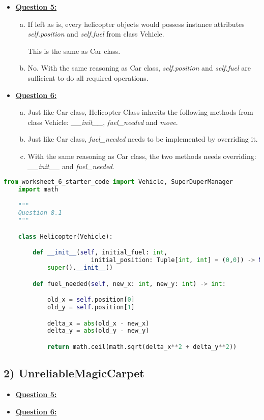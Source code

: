 \documentclass[12pt]{article}
\begin{document}
\begin{itemize}
    \item \underline{\textbf{Question 5:}}
    \begin{enumerate}[a.]
        \item If left as is, every helicopter objects would possess instance attributes
        \textit{self.position} and \textit{self.fuel} from class Vehicle.

        \bigskip

        This is the same as Car class.

        \item No. With the same reasoning as Car class, \textit{self.position}
        and \textit{self.fuel} are sufficient to do all required operations.

    \end{enumerate}
    \item \underline{\textbf{Question 6:}}
    \begin{enumerate}[a.]
        \item Just like Car class, Helicopter Class inherits the following methods
        from class Vehicle: \textit{\_\_init\_\_}, \textit{fuel\_needed} and \textit{move}.

        \item Just like Car class, \textit{fuel\_needed} needs to be
        implemented by overriding it.

        \item With the same reasoning as Car class, the two methods needs
        overriding: \textit{\_\_init\_\_} and \textit{fuel\_needed}.

    \end{enumerate}

\end{itemize}

\begin{lstlisting}[language=Python]
    from worksheet_6_starter_code import Vehicle, SuperDuperManager
    import math

    """
    Question 8.1
    """

    class Helicopter(Vehicle):

        def __init__(self, initial_fuel: int,
                        initial_position: Tuple[int, int] = (0,0)) -> None:
            super().__init__()

        def fuel_needed(self, new_x: int, new_y: int) -> int:

            old_x = self.position[0]
            old_y = self.position[1]

            delta_x = abs(old_x - new_x)
            delta_y = abs(old_y - new_y)

            return math.ceil(math.sqrt(delta_x**2 + delta_y**2))

\end{lstlisting}


\bigskip

\subsection*{2) UnreliableMagicCarpet}

\begin{itemize}
    \item \underline{\textbf{Question 5:}}
    \item \underline{\textbf{Question 6:}}
\end{itemize}
\end{document}
